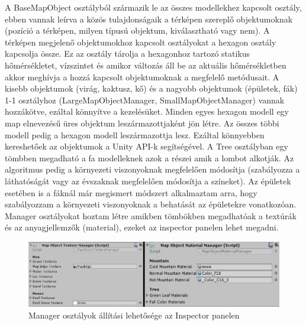 A BaseMapObject osztályból származik le az összes modellekhez kapcsolt osztály, ebben vannak leírva a közös tulajdonságaik a térképen szereplő objektumoknak (pozíció a térképen, milyen típusú objektum, kiválasztható vagy nem). A térképen megjelenő objektumokhoz kapcsolt osztályokat a hexagon osztály kapcsolja össze. Ez az osztály tárolja  a hexagonhoz tartozó statikus hőmérsékletet, vízszintet és amikor változás áll be az aktuális hőmérsékletben akkor meghívja a hozzá kapcsolt objektumoknak a megfelelő metódusait. A kisebb objektumok (virág, kaktusz, kő) és a nagyobb objektumok (épületek, fák) 1-1 osztályhoz (LargeMapObjectManager, SmallMapObjectManager) vannak hozzákötve, ezáltal könnyítve a kezelésüket.
\newline
\newline Minden egyes hexagon modell egy map elnevezésű üres objektum leszármazottjaként jön létre. Az összes többi modell pedig a hexagon modell leszármazottja lesz. Ezáltal könnyebben kereshetőek az objektumok a Unity API-k segítségével.
\newline
\newline A Tree osztályban egy tömbben megadható a fa modelleknek azok a részei amik a lombot alkotják. Az algoritmus pedig a környezeti viszonyoknak megfelelően módosítja (szabályozza a láthatóságát vagy az évszaknak megfelelően módosítja a színeket).
\newline
\newline Az épületek esetében is a fáknál már megismert módszert alkalmaztam arra, hogy szabályozzam a környezeti viszonyoknak a behatását az épületekre vonatkozóan.
\newline
\newline Manager osztályokat hoztam létre amikben tömbökben megadhatóak a textúrák és az anyagjellemzők (material), ezeket az inspector panelen lehet megadni.

\begin{figure}[h!]
\centering
\includegraphics[scale=0.6]{kepek/Managers.jpg}
\caption{Manager osztályok állítási lehetősége az Inspector panelen}
\label{fig:Managers}
\end{figure}

